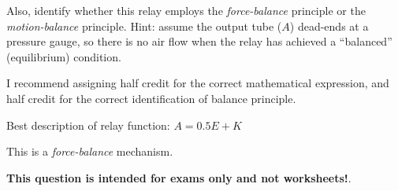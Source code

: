 Also, identify whether this relay employs the {\it force-balance} principle or the {\it motion-balance} principle.  Hint: assume the output tube ($A$) dead-ends at a pressure gauge, so there is no air flow when the relay has achieved a ``balanced'' (equilibrium) condition.







I recommend assigning half credit for the correct mathematical expression, and half credit for the correct identification of balance principle.

\vskip 10pt

Best description of relay function:  $A = 0.5E + K$

\vskip 10pt

This is a {\it force-balance} mechanism.







{\bf This question is intended for exams only and not worksheets!}.



